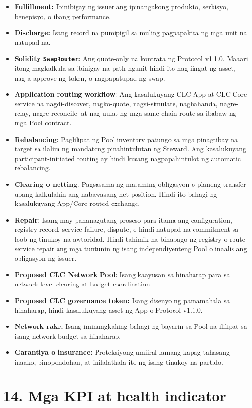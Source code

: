 \documentclass[11pt]{article}
\begin{document}
\begin{itemize}[leftmargin=*]
\item \textbf{Fulfillment:} Ibinibigay ng issuer ang ipinangakong produkto, serbisyo, benepisyo, o ibang performance.
\item \textbf{Discharge:} Isang record na pumipigil sa muling pagpapakita ng mga unit na natupad na.
\item \textbf{Solidity \texttt{SwapRouter}:} Ang quote-only na kontrata ng Protocol v1.1.0. Maaari itong magkalkula sa ibinigay na path ngunit hindi ito nag-iingat ng asset, nag-a-approve ng token, o nagpapatupad ng swap.
\item \textbf{Application routing workflow:} Ang kasalukuyang CLC App at CLC Core service na nagdi-discover, nagko-quote, nagsi-simulate, naghahanda, nagre-relay, nagre-reconcile, at nag-uulat ng mga same-chain route sa ibabaw ng mga Pool contract.
\item \textbf{Rebalancing:} Paglilipat ng Pool inventory patungo sa mga pinagtibay na target sa ilalim ng mandatong pinahintulutan ng Steward. Ang kasalukuyang participant-initiated routing ay hindi kusang nagpapahintulot ng automatic rebalancing.
\item \textbf{Clearing o netting:} Pagsasama ng maraming obligasyon o planong transfer upang kalkulahin ang nabawasang net position. Hindi ito bahagi ng kasalukuyang App/Core routed exchange.
\item \textbf{Repair:} Isang may-pananagutang proseso para itama ang configuration, registry record, service failure, dispute, o hindi natupad na commitment sa loob ng tinukoy na awtoridad. Hindi tahimik na binabago ng registry o route-service repair ang mga tuntunin ng isang independiyenteng Pool o inaalis ang obligasyon ng issuer.
\item \textbf{Proposed CLC Network Pool:} Isang kaayusan sa hinaharap para sa network-level clearing at budget coordination.
\item \textbf{Proposed CLC governance token:} Isang disenyo ng pamamahala sa hinaharap, hindi kasalukuyang asset ng App o Protocol v1.1.0.
\item \textbf{Network rake:} Isang iminungkahing bahagi ng bayarin sa Pool na ililipat sa isang network budget sa hinaharap.
\item \textbf{Garantiya o insurance:} Proteksiyong umiiral lamang kapag tahasang inaako, pinopondohan, at inilalathala ito ng isang tinukoy na partido.
\end{itemize}

\section*{14. Mga KPI at health indicator}
\end{document}
